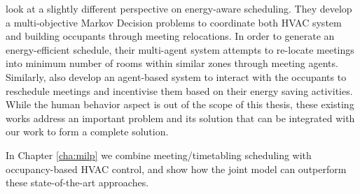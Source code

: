\cite{klein2012coordinating} look at a slightly different perspective on energy-aware scheduling. They develop a multi-objective Markov Decision problems to coordinate both HVAC system and building occupants through meeting relocations. In order to generate an energy-efficient schedule, their multi-agent system attempts to re-locate meetings into minimum number of rooms within similar zones through meeting agents. Similarly, \cite{kwak2014building} also develop an agent-based system to interact with the occupants to reschedule meetings and incentivise them based on their energy saving activities. While the human behavior aspect is out of the scope of this thesis, these existing works address an important problem and its solution that can be integrated with our work to form a complete solution.

In Chapter \ref{cha:milp} we combine meeting/timetabling scheduling with occupancy-based HVAC control, and show how the joint model can outperform these state-of-the-art approaches.





